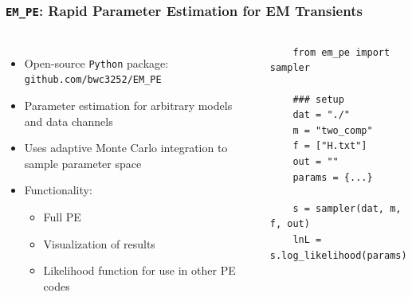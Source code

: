 \documentclass{beamer}
\begin{document}
\begin{frame}[fragile] \frametitle{\texttt{EM\_PE}: Rapid Parameter Estimation for EM Transients}
  \begin{columns}[c]
    \column{2.0in}
    \begin{itemize}
      \item Open-source \texttt{Python} package: \texttt{github.com/bwc3252/EM\_PE} \pause
      \item Parameter estimation for arbitrary models and data channels \pause
      \item Uses adaptive Monte Carlo integration to sample parameter space \pause
      \item Functionality: \pause
      \begin{itemize}
        \item Full PE \pause
        \item Visualization of results \pause
        \item Likelihood function for use in other PE codes \pause
      \end{itemize}
    \end{itemize}
    \column{3.0in}
    \begin{verbatim}
    from em_pe import sampler

    ### setup
    dat = "./"
    m = "two_comp"
    f = ["H.txt"]
    out = ""
    params = {...}

    s = sampler(dat, m, f, out)
    lnL = s.log_likelihood(params)
    \end{verbatim}
  \end{columns}
\end{frame}

\end{document}
